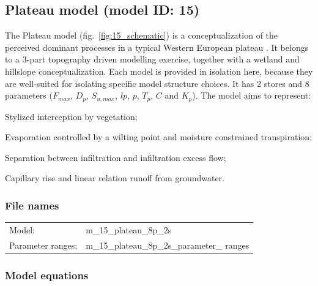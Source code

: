 \subsection{Plateau model (model ID: 15)}
The Plateau model (fig.~\ref{fig:15_schematic}) is a conceptualization of the perceived dominant processes in a typical Western European plateau \citep{Savenije2010}. It belongs to a 3-part topography driven modelling exercise, together with a wetland and hillslope conceptualization. Each model is provided in isolation here, because they are well-suited for isolating specific model structure choices. It has 2 stores and 8 parameters ($F_{max}$, $D_p$, $S_{u,max}$, $lp$, $p$, $T_p$, $C$ and $K_p$). The model aims to represent:

\begin{itemizecompact}
\item Stylized interception by vegetation;
\item Evaporation controlled by a wilting point and moisture constrained transpiration;
\item Separation between infiltration and infiltration excess flow;
\item Capillary rise and linear relation runoff from groundwater.
\end{itemizecompact}

\subsubsection{File names}
\begin{tabular}{@{}ll}
Model: &m\_15\_plateau\_8p\_2s \\
Parameter ranges: &m\_15\_plateau\_8p\_2s\_parameter\_ ranges \\
\end{tabular}

\subsubsection{Model equations}

